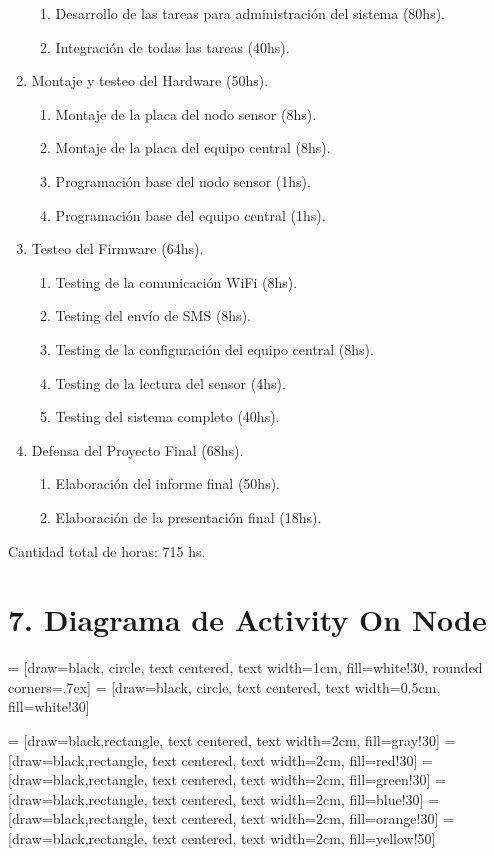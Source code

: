 \documentclass[11pt]{charter}
\begin{document}
\begin{enumerate}
\begin{enumerate}
	\item Desarrollo de las tareas para administración del sistema (80hs).
	\item Integración de todas las tareas (40hs).
	\end{enumerate}
\item Montaje y testeo del Hardware (50hs).
	\begin{enumerate}
	\item Montaje de la placa del nodo sensor (8hs).
	\item Montaje de la placa del equipo central (8hs).
	\item Programación base del nodo sensor (1hs).
	\item Programación base del equipo central (1hs).
	\end{enumerate}
\item Testeo del Firmware (64hs).
	\begin{enumerate}
	\item Testing de la comunicación WiFi (8hs).
	\item Testing del envío de SMS (8hs).
	\item Testing de la configuración del equipo central (8hs).
	\item Testing de la lectura del sensor (4hs).
	\item Testing del sistema completo (40hs).
	\end{enumerate}
\item Defensa del Proyecto Final (68hs).
	\begin{enumerate}
	\item Elaboración del informe final (50hs).
	\item Elaboración de la presentación final (18hs).
	\end{enumerate}
\end{enumerate}

Cantidad total de horas: 715 hs.

\section{7. Diagrama de Activity On Node}
\label{sec:AoN}

\usetikzlibrary{positioning}

 = [draw=black, circle, text centered, text width=1cm, fill=white!30, rounded corners=.7ex]
     = [draw=black, circle, text centered, text width=0.5cm, fill=white!30]

 = [draw=black,rectangle, text centered, text width=2cm, fill=gray!30]
 = [draw=black,rectangle, text centered, text width=2cm, fill=red!30]
 = [draw=black,rectangle, text centered, text width=2cm, fill=green!30]
 = [draw=black,rectangle, text centered, text width=2cm, fill=blue!30]
 = [draw=black,rectangle, text centered, text width=2cm, fill=orange!30]
 = [draw=black,rectangle, text centered, text width=2cm, fill=yellow!50]
\end{document}
